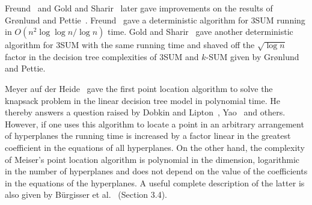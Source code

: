 Freund~\cite{Fr15} and Gold and Sharir~\cite{GS15} later gave improvements on the
results of Gr{\o}nlund and Pettie~\cite{GP18}. Freund~\cite{Fr15} gave a deterministic algorithm for
3SUM running in \(O( {n^2\log \log n}/{\log n})\) time.
Gold and Sharir~\cite{GS15} gave another deterministic algorithm for 3SUM
with the same running time and shaved off the $\sqrt{\log n}$ factor in the
decision tree complexities of 3SUM and \(k\)-SUM given by Gr{\o}nlund and Pettie.

Meyer auf der Heide~\cite{M84} gave the first point location algorithm to solve the knapsack
problem in the linear decision tree model in polynomial time. He thereby
answers a question raised by Dobkin and Lipton~\cite{DL74,DL78}, Yao~\cite{Y82}
and others. However, if one uses this algorithm to locate a point in an
arbitrary arrangement of hyperplanes the running time is increased by a factor
linear in the greatest coefficient in the equations of all hyperplanes.
On the other hand, the complexity of Meiser's point location algorithm is
polynomial in the dimension, logarithmic in the number of hyperplanes and
does not depend on the value of the coefficients in the equations of the
hyperplanes. A useful complete description of the latter is also given by
Bürgisser et al.~\cite{B97} (Section 3.4).

